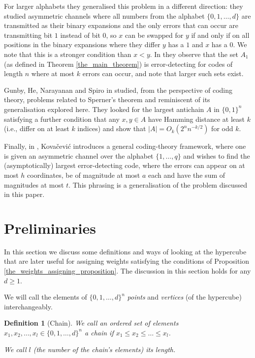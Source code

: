 \documentclass[11pt, reqno]{amsart}
\newcommand{\leanblueprintbase}{https://mj141592.github.io/weighted-chains-paper}
\newif\ifleanlinks
\newcommand{\leanblueprint}[1]{%
  \ifleanlinks
    \leavevmode\unskip\penalty9999\hbox{}\nobreak\hfill\quad
    \href{\leanblueprintbase/theorems/#1/}{%
      \mbox{\normalfont\footnotesize\textcolor{blue}{[\textsf{Lean formalisation}]}}}%
    \par\nobreak
  \fi
}
\newtheorem{definition}[theorem]{Definition}
\theoremstyle{remark}
\numberwithin{equation}{section}
\newcommand{\thehypercube}{\{0, 1, \ldots, d\}^n}
\begin{document}
For larger alphabets they generalised this problem in a different direction: they studied asymmetric channels where all numbers from the alphabet $\{0, 1, \dots, d\}$ are transmitted as their binary expansions and the only errors that can occur are transmitting bit $1$ instead of bit $0$, so $x$ can be swapped for $y$ if and only if on all positions in the binary expansions where they differ $y$ has a $1$ and $x$ has a $0$. We note that this is a stronger condition than $x < y$. In \cite[Proposition 6]{asymmetric_channels} they observe that the set $A_1$ (as defined in Theorem \ref{the_main_theorem}) is error-detecting for codes of length $n$ where at most $k$ errors can occur, and note that larger such sets exist.

Gunby, He, Narayanan and Spiro in \cite{more_coding_theory} studied, from the perspective of coding theory, problems related to Sperner's theorem and reminiscent of its generalisation explored here. They looked for the largest antichain $A$ in $\{0, 1\}^n$ satisfying a further condition that any $x, y \in A$ have Hamming distance at least $k$ (i.e., differ on at least $k$ indices) and show that $\vert A\vert=O_k(2^nn^{-k/2})$ for odd $k$.

Finally, in \cite{on_error_detection_in_asymmetric_channels}, Kovačević introduces a general coding-theory framework, where one is given an asymmetric channel over the alphabet $\{1, \dots, q\}$ and wishes to find the (asymptotically) largest error-detecting code, where the errors can appear on at most $h$ coordinates, be of magnitude at most $a$ each and have the sum of magnitudes at most $t$. This phrasing is a generalisation of the problem discussed in this paper.

\section{Preliminaries}
\label{section_strategy}

In this section we discuss some definitions and ways of looking at the hypercube that are later useful for assigning weights satisfying the conditions of Proposition \ref{the_weights_assigning_proposition}. The discussion in this section holds for any $d \geqslant 1$. 

We will call the elements of $\thehypercube$ \emph{points} and \emph{vertices} (of the hypercube) interchangeably.

\begin{definition}[Chain]
\label{wc:def:chain}
    We call an ordered set of elements $x_1, x_2, \ldots, x_l \in \thehypercube$ a chain if $x_1 \leqslant x_2 \leqslant \ldots \leqslant x_l$.

    We call $l$ (the number of the chain's elements) its length.
\leanblueprint{chain}
\end{definition}
\end{document}
